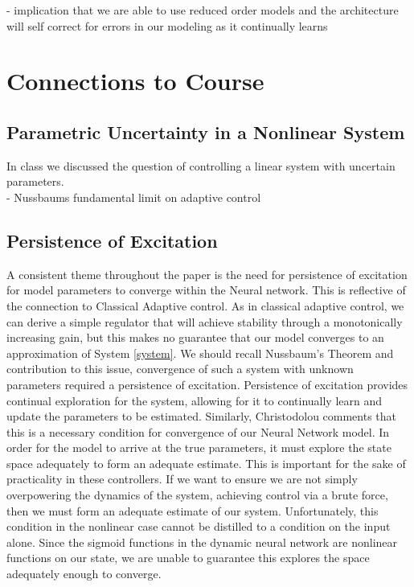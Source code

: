 \documentclass[12pt, letterpaper]{article}
\begin{document}
	- implication that we are able to use reduced order models and the architecture will self correct for errors in our modeling as it continually learns
	
	\section{Connections to Course}
	\subsection{Parametric Uncertainty in a Nonlinear System}
	In class we discussed the question of controlling a linear system with uncertain parameters. \\
	
	- Nussbaums fundamental limit on adaptive control 
	
	 
	
	\subsection{Persistence of Excitation}
	A consistent theme throughout the paper is the need for persistence of excitation for model parameters to converge within the Neural network. This is reflective of the connection to Classical Adaptive control. As in classical adaptive control, we can derive a simple regulator that will achieve stability through a monotonically increasing gain, but this makes no guarantee that our model converges to an approximation of System \ref{system}. We should recall Nussbaum's Theorem and contribution to this issue, convergence of such a system with unknown parameters required a persistence of excitation. Persistence of excitation provides continual exploration for the system, allowing for it to continually learn and update the parameters to be estimated. Similarly, Christodolou comments that this is a necessary condition for convergence of our Neural Network model. In order for the model to arrive at the true parameters, it must explore the state space adequately to form an adequate estimate. This is important for the sake of practicality in these controllers. If we want to ensure we are not simply overpowering the dynamics of the system, achieving control via a brute force, then we must form an adequate estimate of our system. Unfortunately, this condition in the nonlinear case cannot be distilled to a condition on the input alone. Since the sigmoid functions in the dynamic neural network are nonlinear functions on our state, we are unable to guarantee this explores the space adequately enough to converge\cite{Christ}.
	
\end{document}
